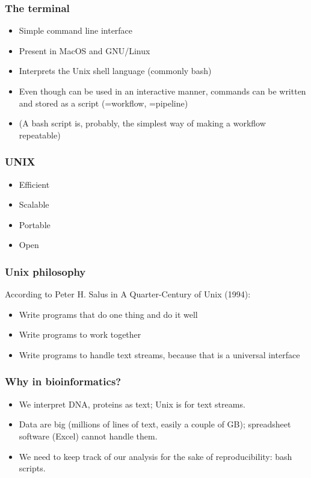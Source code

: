 \documentclass{beamer}
\begin{document}
\begin{frame}
  \frametitle{The terminal}
  \begin{itemize}
    
  \item Simple command line interface 
  \item Present in MacOS and GNU/Linux
  \item Interprets the Unix shell language (commonly bash)
  \item Even though can be used in an interactive manner, commands can be written and stored as a script (=workflow, =pipeline)
  \item (A bash script is, probably, the simplest way of making a workflow repeatable)
  \end{itemize}

\end{frame}


\begin{frame}
  \frametitle{UNIX}
  \begin{itemize}
  \item Efficient
  \item Scalable
  \item Portable
  \item Open
  \end{itemize}
\end{frame}


\begin{frame}
  \frametitle{Unix philosophy}
According to Peter H. Salus in A Quarter-Century of Unix (1994):
  \begin{itemize}
  \item Write programs that do one thing and do it well
  \item Write programs to work together
  \item Write programs to handle text streams, because that is a universal interface
  \end{itemize}
\end{frame}


\begin{frame}
  \frametitle{Why in bioinformatics?}
  \begin{itemize}
  \item We interpret DNA, proteins as text; Unix is for text streams.
  \item Data are big (millions of lines of text, easily a couple of GB); spreadsheet software (Excel) cannot handle them.
  \item We need to keep track of our analysis for the sake of reproducibility: bash scripts.
  \end{itemize}
\end{frame}
\end{document}
